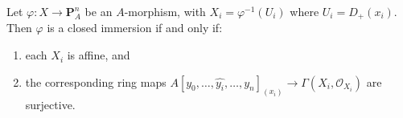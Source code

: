 Let $\varphi: X \to \mathbf{P}_A^n$ be an $A$-morphism, with $X_i = \varphi^{-1}(U_i)$ where $U_i = D_+(x_i)$. Then $\varphi$ is a closed immersion if and only if:
\begin{enumerate}
\item[(1)] each $X_i$ is affine, and
\item[(2)] the corresponding ring maps $A[y_0,\ldots,\hat{y_i},\ldots,y_n]_{(x_i)} \to \Gamma(X_i, \mathcal{O}_{X_i})$ are surjective.
\end{enumerate}
